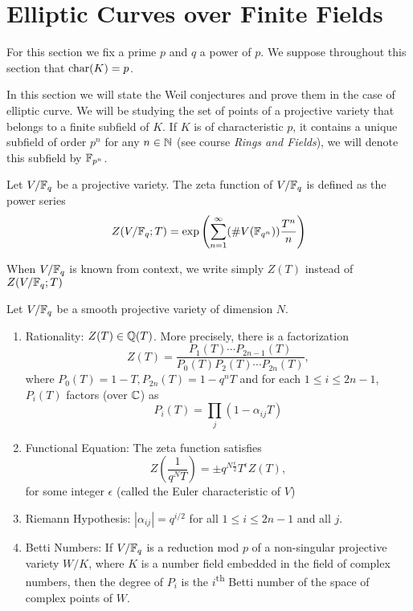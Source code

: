 \section{Elliptic Curves over Finite Fields}

For this section we fix a prime $p$ and $q$ a power of $p$.
We suppose throughout this section that $\operatorname{char}(K) = p$.

In this section we will state the Weil conjectures and prove them in the
case of elliptic curve. We will be studying the set of points of a projective
variety that belongs to a finite subfield of $K$. If $K$ is of characteristic
$p$, it contains a unique subfield of order $p^n$ for any $n \in \mathbb{N}$ (see
course \emph{Rings and Fields}), we will denote this subfield by $\mathbb{F}_{p^n}$.

\begin{definition}
	Let $V/\mathbb{F}_q$ be a projective variety.
	The zeta function of $V/\mathbb{F}_q$ is defined as the power series
	\begin{equation*}
		Z(V/\mathbb{F}_q; T) = \exp\left(\sum_{n=1}^\infty (\#V(\mathbb{F}_{q^n}))
		\frac{T^n}{n}\right)
	\end{equation*}
\end{definition}

\begin{notation}
	When $V/\mathbb{F}_q$ is known from context, we write simply $Z(T)$
	instead of $Z(V/\mathbb{F}_q; T)$
\end{notation}

\begin{theorem}
	\label{thm:weil}
	Let $V/\mathbb{F}_q$ be a smooth projective variety of dimension $N$.
	\begin{enumerate}[label=(\alph*)]
		\item Rationality: $Z(T) \in \mathbb{Q}(T)$. More precisely, 
			there is a factorization
			\begin{equation*}
				Z(T) = \frac{P_1(T)\cdots P_{2n-1}(T)}
				{P_0(T)P_2(T) \cdots P_{2n}(T)},
			\end{equation*}
			where $P_0(T) = 1 - T, P_{2n}(T) = 1 - q^nT$ and for each
			$1 \leq i \leq 2n - 1$, $P_i(T)$ factors (over $\mathbb{C}$) as
			\begin{equation*}
				P_i(T) = \prod_j (1 - \alpha_{ij}T)
			\end{equation*}
		\item Functional Equation: The zeta function satisfies
			\begin{equation*}
				Z\left(\frac{1}{q^NT}\right) = \pm q^{N\frac{\epsilon}{2}}
				T^{\epsilon} Z(T),
			\end{equation*}
			for some integer $\epsilon$ (called the Euler characteristic of $V$)
		\item Riemann Hypothesis: $|\alpha_{ij}| = q^{i/2}$
			for all $1 \leq i \leq 2n - 1$ and all $j$.
		\item Betti Numbers: If $V/\mathbb{F}_q$ is a reduction mod $p$ of a
			non-singular projective variety $W/K$, where $K$ is a number
			field embedded in the field of complex numbers, then the degree
			of $P_i$ is the $i$\textsuperscript{th} Betti number of the space
			of complex points of $W$.
	\end{enumerate}
\end{theorem}

